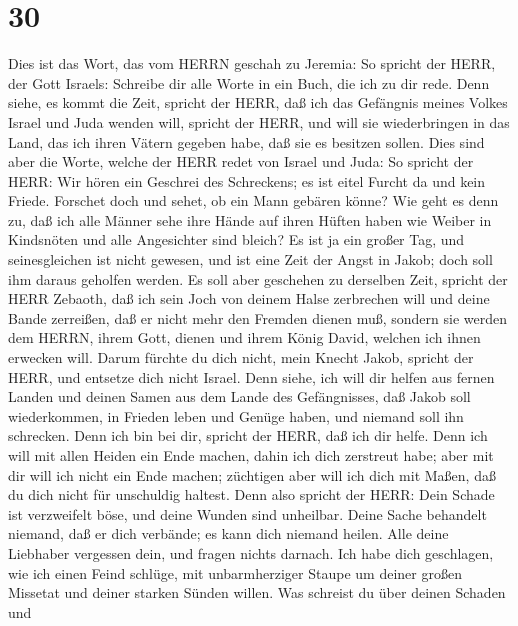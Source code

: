 \hypertarget{section-29}{%
\section{30}\label{section-29}}

 Dies ist das Wort, das vom HERRN geschah zu Jeremia:
 So spricht der HERR, der Gott Israels: Schreibe dir alle
Worte in ein Buch, die ich zu dir rede.  Denn siehe, es
kommt die Zeit, spricht der HERR, daß ich das Gefängnis meines Volkes
Israel und Juda wenden will, spricht der HERR, und will sie
wiederbringen in das Land, das ich ihren Vätern gegeben habe, daß sie es
besitzen sollen.  Dies sind aber die Worte, welche der HERR
redet von Israel und Juda:  So spricht der HERR: Wir hören
ein Geschrei des Schreckens; es ist eitel Furcht da und kein Friede.
 Forschet doch und sehet, ob ein Mann gebären könne? Wie
geht es denn zu, daß ich alle Männer sehe ihre Hände auf ihren Hüften
haben wie Weiber in Kindsnöten und alle Angesichter sind bleich?
 Es ist ja ein großer Tag, und seinesgleichen ist nicht
gewesen, und ist eine Zeit der Angst in Jakob; doch soll ihm daraus
geholfen werden.  Es soll aber geschehen zu derselben Zeit,
spricht der HERR Zebaoth, daß ich sein Joch von deinem Halse zerbrechen
will und deine Bande zerreißen, daß er nicht mehr den Fremden dienen
muß,  sondern sie werden dem HERRN, ihrem Gott, dienen und
ihrem König David, welchen ich ihnen erwecken will.  Darum
fürchte du dich nicht, mein Knecht Jakob, spricht der HERR, und entsetze
dich nicht Israel. Denn siehe, ich will dir helfen aus fernen Landen und
deinen Samen aus dem Lande des Gefängnisses, daß Jakob soll
wiederkommen, in Frieden leben und Genüge haben, und niemand soll ihn
schrecken.  Denn ich bin bei dir, spricht der HERR, daß ich
dir helfe. Denn ich will mit allen Heiden ein Ende machen, dahin ich
dich zerstreut habe; aber mit dir will ich nicht ein Ende machen;
züchtigen aber will ich dich mit Maßen, daß du dich nicht für unschuldig
haltest.  Denn also spricht der HERR: Dein Schade ist
verzweifelt böse, und deine Wunden sind unheilbar.  Deine
Sache behandelt niemand, daß er dich verbände; es kann dich niemand
heilen.  Alle deine Liebhaber vergessen dein, und fragen
nichts darnach. Ich habe dich geschlagen, wie ich einen Feind schlüge,
mit unbarmherziger Staupe um deiner großen Missetat und deiner starken
Sünden willen.  Was schreist du über deinen Schaden und
